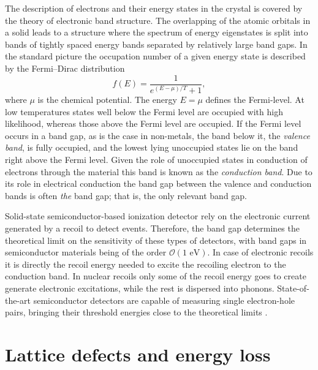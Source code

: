 \documentclass[b5paper, 10pt, twoside]{book}
\begin{document}
The description of electrons and their energy states in the crystal is covered by the theory of electronic band structure. The overlapping of the atomic orbitals in a solid leads to a structure where the spectrum of energy eigenstates is split into bands of tightly spaced energy bands separated by relatively large band gaps. In the standard picture the occupation number of a given energy state is described by the Fermi--Dirac distribution
\begin{equation}
    f(E)=\frac{1}{e^{(E-\mu)/T}+1},
\end{equation}
where $\mu$ is the chemical potential. The energy $E=\mu$ defines the Fermi-level. At low temperatures states well below the Fermi level are occupied with high likelihood, whereas those above the Fermi level are occupied. If the Fermi level occurs in a band gap, as is the case in non-metals, the band below it, the \emph{valence band}, is fully occupied, and the lowest lying unoccupied states lie on the band right above the Fermi level. Given the role of unoccupied states in conduction of electrons through the material this band is known as the \emph{conduction band}. Due to its role in electrical conduction the band gap between the valence and conduction bands is often \emph{the} band gap; that is, the only relevant band gap.

Solid-state semiconductor-based ionization detector rely on the electronic current generated by a recoil to detect events. Therefore, the band gap determines the theoretical limit on the sensitivity of these types of detectors, with band gaps in semiconductor materials being of the order $\mathcal{O}(1\text{ eV})$. In case of electronic recoils it is directly the recoil energy needed to excite the recoiling electron to the conduction band. In nuclear recoils only some of the recoil energy goes to create generate electronic excitations, while the rest is dispersed into phonons. State-of-the-art semiconductor detectors are capable of measuring single electron-hole pairs, bringing their threshold energies close to the theoretical limits \parencites{RomaniEtAl2018, CrislerEtAl2018, EDELWEISS2020}.

\section{Lattice defects and energy loss}
\end{document}
